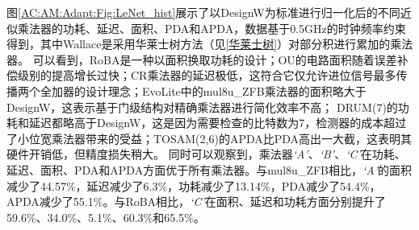 图\ref{AC:AM:Adapt:Fig:LeNet_hist}展示了以DesignW为标准进行归一化后的不同近似乘法器的功耗、延迟、面积、PDA和APDA，数据基于0.5GHz的时钟频率约束得到，其中Wallace是采用华莱士树方法（见\ref{华莱士树}）对部分积进行累加的乘法器。
可以看到，RoBA是一种以面积换取功耗的设计；OU的电路面积随着误差补偿级别的提高增长过快；CR乘法器的延迟极低，这符合它仅允许进位信号最多传播两个全加器的设计理念；EvoLite中的mul8u\_ZFB乘法器的面积略大于DesignW，这表示基于门级结构对精确乘法器进行简化效率不高；
DRUM(7)的功耗和延迟都略高于DesignW，这是因为需要检查的比特数为7，检测器的成本超过了小位宽乘法器带来的受益；TOSAM(2,6)的APDA比PDA高出一大截，这表明其硬件开销低，但精度损失稍大。
同时可以观察到，乘法器\emph{`A'}、\emph{`B'}、\emph{`C'}在功耗、延迟、面积、PDA和APDA方面优于所有乘法器。与mul8u\_ZFB相比，\emph{`A'}的面积减少了44.57\%，延迟减少了6.3\%，功耗减少了13.14\%，PDA减少了54.4\%，APDA减少了55.1\%。与RoBA相比，\emph{`C'}在面积、延迟和功耗方面分别提升了59.6\%、34.0\%、5.1\%、60.3\%和65.5\%。

